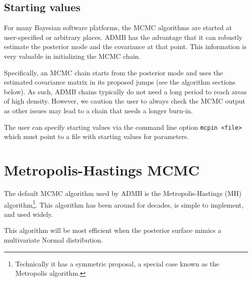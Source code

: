 \documentclass{article}\usepackage[]{graphicx}\usepackage[]{color}
\begin{document}

\subsection{Starting values}\label{sec:startvals}
For many Bayesian software platforms, the MCMC algorithms
are started at user-specified or arbitrary places. ADMB has the
advantage that it can robustly estimate the posterior mode
and the covariance at that point. This information is very
valuable in initializing the MCMC chain.

Specifically, an MCMC chain starts from the posterior mode
and uses the estimated covariance matrix in its proposed
jumps (see the algorithm sections below). As such, ADMB
chains typically do not need a long period to reach areas of
high density. However, we caution the user to always check
the MCMC output as other issues may lead to a chain that
needs a longer burn-in.

The user can specify starting values via the command line
option \texttt{mcpin <file>} which must point to a file with
starting values for parameters.

\section{Metropolis-Hastings MCMC}\label{sec:MH}
The default MCMC algorithm used by ADMB is the
Metropolis-Hastings (MH) algorithm\footnote{Technically it
  has a symmetric proposal, a special case known as the
  Metropolis algorithm.}. This algorithm has been around for
decades, is simple to implement, and used widely.

This algorithm will be most efficient when the posterior
surface mimics a multivariate Normal distribution.
\end{document}
